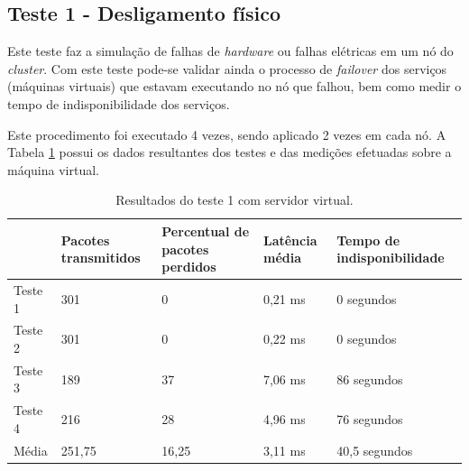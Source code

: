 \subsection{Teste 1 - Desligamento físico}

Este teste faz a simulação de falhas de \textit{hardware} ou falhas elétricas em um nó do \textit{cluster}. Com este teste pode-se validar ainda 
o processo de \textit{failover} dos serviços (máquinas virtuais) que estavam executando no nó que falhou, bem como medir o tempo de 
indisponibilidade dos serviços.


Este procedimento foi executado 4 vezes, sendo aplicado 2 vezes em cada nó. A Tabela \ref{tab:teste1resultadosvirt} possui os dados 
resultantes dos testes e das medições efetuadas sobre a máquina virtual.

\begin{table}[h!]
\caption{Resultados do teste 1 com servidor virtual.}
\label{tab:teste1resultadosvirt}
\begin{center}
\begin{tabular}{|l|p{2.2cm}|p{2.5cm}|p{2cm}|p{2.7cm}|}\hline
 & \textbf{Pacotes transmitidos} & \textbf{Percentual de pacotes perdidos} & \textbf{Latência média} & \textbf{Tempo de indisponibilidade} \\\hline
Teste 1 & 301 & 0 & 0,21 ms & 0 segundos \\\hline
Teste 2 & 301 & 0 & 0,22 ms & 0 segundos \\\hline
Teste 3 & 189 & 37 & 7,06 ms & 86 segundos \\\hline
Teste 4 & 216 & 28 & 4,96 ms & 76 segundos \\\hline
Média & 251,75 & 16,25 & 3,11 ms & 40,5 segundos \\\hline
\end{tabular}
\end{center}
\end{table}

